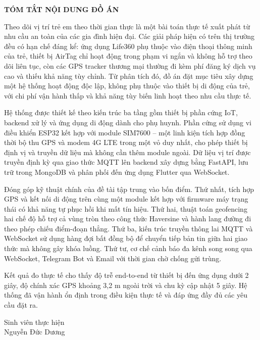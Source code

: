 \documentclass[../DoAn.tex]{subfiles}
\begin{document}
\begin{center}
    \Large{\textbf{TÓM TẮT NỘI DUNG ĐỒ ÁN}}\\
\end{center}
\vspace{1cm}

Theo dõi vị trí trẻ em theo thời gian thực là một bài toán thực tế xuất phát từ nhu cầu an toàn của các gia đình hiện đại. Các giải pháp hiện có trên thị trường đều có hạn chế đáng kể: ứng dụng Life360 phụ thuộc vào điện thoại thông minh của trẻ, thiết bị AirTag chỉ hoạt động trong phạm vi ngắn và không hỗ trợ theo dõi liên tục, còn các GPS tracker thương mại thường đi kèm phí đăng ký dịch vụ cao và thiếu khả năng tùy chỉnh. Từ phân tích đó, đồ án đặt mục tiêu xây dựng một hệ thống hoạt động độc lập, không phụ thuộc vào thiết bị di động của trẻ, với chi phí vận hành thấp và khả năng tùy biến linh hoạt theo nhu cầu thực tế.

Hệ thống được thiết kế theo kiến trúc ba tầng gồm thiết bị phần cứng IoT, backend xử lý và ứng dụng di động dành cho phụ huynh. Phần cứng sử dụng vi điều khiển ESP32 kết hợp với module SIM7600 -- một linh kiện tích hợp đồng thời bộ thu GPS và modem 4G LTE trong một vỏ duy nhất, cho phép thiết bị định vị và truyền dữ liệu mà không cần thêm module ngoài. Dữ liệu vị trí được truyền định kỳ qua giao thức MQTT lên backend xây dựng bằng FastAPI, lưu trữ trong MongoDB và phân phối đến ứng dụng Flutter qua WebSocket.

Đóng góp kỹ thuật chính của đề tài tập trung vào bốn điểm. Thứ nhất, tích hợp GPS và kết nối di động trên cùng một module kết hợp với firmware máy trạng thái có khả năng tự phục hồi khi mất tín hiệu. Thứ hai, thuật toán geofencing hai chế độ hỗ trợ cả vùng tròn theo công thức Haversine và hành lang đường đi theo phép chiếu điểm-đoạn thẳng. Thứ ba, kiến trúc truyền thông lai MQTT và WebSocket sử dụng hàng đợi bất đồng bộ để chuyển tiếp bản tin giữa hai giao thức mà không gây khóa luồng. Thứ tư, cơ chế cảnh báo đa kênh song song qua WebSocket, Telegram Bot và Email với thời gian chờ chống gửi trùng.

Kết quả đo thực tế cho thấy độ trễ end-to-end từ thiết bị đến ứng dụng dưới 2 giây, độ chính xác GPS khoảng 3,2 m ngoài trời và chu kỳ cập nhật 5 giây. Hệ thống đã vận hành ổn định trong điều kiện thực tế và đáp ứng đầy đủ các yêu cầu đặt ra.

\begin{flushright}
Sinh viên thực hiện\\
\vspace{0.5cm}
Nguyễn Đức Dương
\end{flushright}
\end{document}
